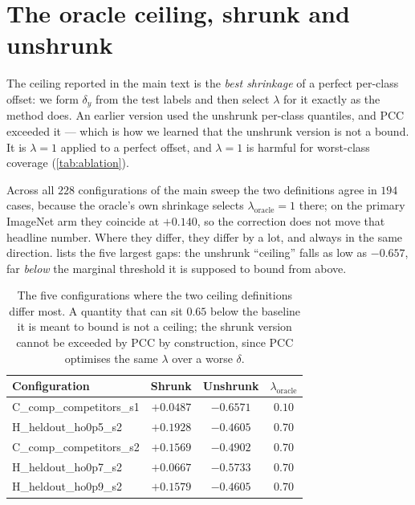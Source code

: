 \section{The oracle ceiling, shrunk and unshrunk}
\label{app:oracle}

The ceiling reported in the main text is the \emph{best shrinkage} of a perfect per-class
offset: we form $\delta_y$ from the test labels and then select $\lambda$ for it exactly as
the method does. An earlier version used the unshrunk per-class quantiles, and PCC exceeded
it --- which is how we learned that the unshrunk version is not a bound. It is $\lambda=1$
applied to a perfect offset, and $\lambda=1$ is harmful for worst-class coverage
(\cref{tab:ablation}).

Across all $228$ configurations of the main sweep the two definitions agree in
$194$ cases, because the oracle's own shrinkage selects
$\lambda_{\text{oracle}}=1$ there; on the primary ImageNet arm they coincide at $+0.140$, so
the correction does not move that headline number. Where they differ, they differ by a lot,
and always in the same direction.  lists the five largest gaps: the unshrunk
``ceiling'' falls as low as $-0.657$, far \emph{below} the marginal threshold it is supposed
to bound from above.

\begin{table}[h]
\centering
\small
\setlength{\tabcolsep}{4pt}
\begin{tabular}{lccc}
\toprule
Configuration & Shrunk & Unshrunk & $\lambda_{\text{oracle}}$ \\
\midrule
C\_comp\_competitors\_s1 & $+0.0487$ & $-0.6571$ & $0.10$ \\
H\_heldout\_ho0p5\_s2 & $+0.1928$ & $-0.4605$ & $0.70$ \\
C\_comp\_competitors\_s2 & $+0.1569$ & $-0.4902$ & $0.70$ \\
H\_heldout\_ho0p7\_s2 & $+0.0667$ & $-0.5733$ & $0.70$ \\
H\_heldout\_ho0p9\_s2 & $+0.1579$ & $-0.4605$ & $0.70$ \\
\bottomrule
\end{tabular}
\caption{The five configurations where the two ceiling definitions differ most. A quantity
that can sit $0.65$ below the baseline it is meant to bound is not a ceiling; the shrunk
version cannot be exceeded by PCC by construction, since PCC optimises the same $\lambda$
over a worse $\delta$.}
\label{tab:oracle}
\end{table}

